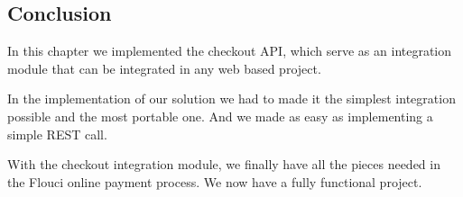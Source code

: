 \begin{spacing}{1.2}
\section*{Conclusion}
In this chapter we implemented the checkout API, which serve as an integration module that can be integrated in any web based project.

In the implementation of our solution we had to made it the simplest integration possible and the most portable one. And we made as easy as implementing a simple REST call.

With the checkout integration module, we finally have all the pieces needed in the Flouci online payment process. We now have a fully functional project.

\end{spacing}

